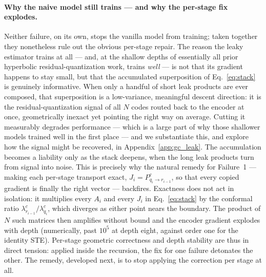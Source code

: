 \documentclass[12pt]{report}
\begin{document}
\paragraph{Why the naive model still trains --- and why the per-stage fix explodes.}
Neither failure, on its own, stops the vanilla model from training; taken together they nonetheless rule out the obvious per-stage repair. The reason the leaky estimator trains at all --- and, at the shallow depths of essentially all prior hyperbolic residual-quantization work, trains \emph{well} --- is not that its gradient happens to stay small, but that the accumulated superposition of Eq.~\ref{eq:stack} is genuinely informative. When only a handful of short leak products are ever composed, that superposition is a low-variance, meaningful descent direction: it is the residual-quantization signal of all $N$ codes routed back to the encoder at once, geometrically inexact yet pointing the right way on average. Cutting it measurably degrades performance --- which is a large part of why those shallower models trained well in the first place --- and we substantiate this, and explore how the signal might be recovered, in Appendix~\ref{app:gc_leak}. The accumulation becomes a liability only as the stack deepens, when the long leak products turn from signal into noise. This is precisely why the natural remedy for Failure~1 --- making each per-stage transport exact, $J_i=P^c_{q_i\to r_{i-1}}$, so that every copied gradient is finally the right vector --- backfires. Exactness does not act in isolation: it multiplies every $A_i$ and every $J_i$ in Eq.~\ref{eq:stack} by the conformal ratio $\lambda^c_{r_{i-1}}/\lambda^c_{q_i}$, which diverges as either point nears the boundary. The product of $N$ such matrices then amplifies without bound and the encoder gradient explodes with depth (numerically, past $10^5$ at depth eight, against order one for the identity STE). Per-stage geometric correctness and depth stability are thus in direct tension: applied inside the recursion, the fix for one failure detonates the other. The remedy, developed next, is to stop applying the correction per stage at all.
\end{document}
